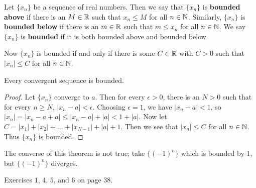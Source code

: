 \begin{definition}
    Let $\{x_n\}$ be a sequence of real numbers. Then we say that $\{x_n\}$ is \textbf{bounded above} if there is an $M \in \mathbb{R}$ 
    such that $x_n \leq M$ for all $n \in \mathbb{N}$. Similarly, $\{x_n\}$ is \textbf{bounded below} if there is an $m \in \mathbb{R}$ such 
    that  $m \leq x_n$ for all $n \in \mathbb{N}$. We say $\{x_n\}$ is \textbf{bounded} if it is both bounded above and bounded 
    below
\end{definition}

Now $\{x_n\}$ is bounded if and only if there is some  $C \in \mathbb{R}$ with $C>0$ such that  $|x_n| \leq C$ for all $n \in \mathbb{N}$.

\begin{theorem}
    Every convergent sequence is bounded.
\end{theorem}
\begin{proof}
    Let $\{x_n\}$ converge to $a$. Then for every $\epsilon>0$, there is an  $N>0$ such that for every  $n \geq N$,  
$|x_n-a|<\epsilon$. Choosing  $\epsilon=1$, we have  $|x_n-a|<1$, so  $|x_n|=|x_n-a+a| \leq |x_n-a|+|a|<1+|a|$. Now let  
$C=|x_1|+|x_2|+\dots+|x_{N-1}|+|a|+1$. Then we see that $|x_n| \leq C$ for all  $n \in \mathbb{N}$. Thus  $\{x_n\}$ is bounded. 
\end{proof}

The converse of this theorem is not true; take $\{(-1)^n\}$ which is bounded by  $1$, but  $\{(-1)^n\}$ diverges.

\begin{HW}
    Exercises  $1$,  $4$,  $5$,  and $6$ on page  $38$.
\end{HW}
